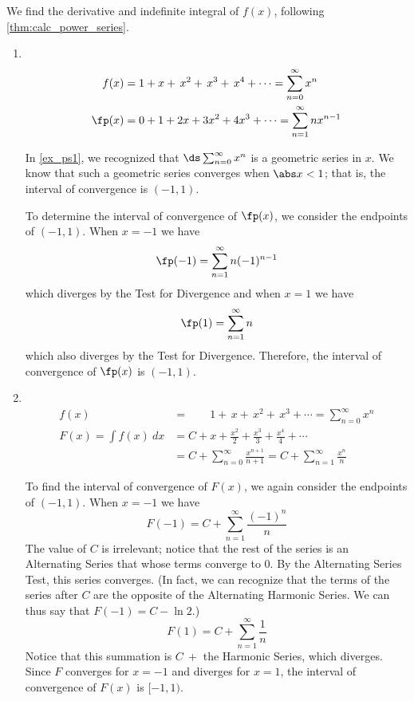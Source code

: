 {We find the derivative and indefinite integral of $f(x)$, following \autoref{thm:calc_power_series}.

\begin{enumerate}
\item\mbox{}\\[-3\baselineskip]
\begin{align*}
f(x)&=1+x+\,x^2+\,x^3+\,x^4+\dotsb = \sum_{n=0}^\infty x^n\\
\fp(x) &= 0+1+2x+3x^2+4x^3+\dotsb=\sum_{n=1}^\infty nx^{n-1} 
\end{align*}

In \autoref{ex_ps1}, we recognized that $\ds \sum_{n=0}^\infty x^n$ is a geometric series in $x$. We know that such a geometric series converges when $\abs x<1$; that is, the interval of convergence is $(-1,1)$.

To determine the interval of convergence of $\fp(x)$, we consider the endpoints of $(-1,1)$.
When $x=-1$ we have
\[\fp(-1) = \sum_{n=1}^\infty n(-1)^{n-1}\]
which diverges by the Test for Divergence
and when $x=1$ we have
\[\fp(1) = \sum_{n=1}^\infty n\]
which also diverges by the Test for Divergence. Therefore, the interval of convergence of $\fp(x)$ is $(-1,1)$. 

\item\mbox{}\\[-3\baselineskip]
\begin{align*}
 f(x)&=\phantom{C+{}}1+\,x+\,x^2+\,x^3+\dotsb = \sum_{n=0}^\infty x^n\\
 F(x) = \int f(x)\ dx &= C+ x+\frac{x^2}{2}+\frac{x^3}3+\frac{x^4}4+\dotsb \\
 &= C+\sum_{n=0}^\infty \frac{x^{n+1}}{n+1}=C+\sum_{n=1}^\infty \frac{x^{n}}{n}  
\end{align*}

To find the interval of convergence of $F(x)$, we again consider the endpoints of $(-1,1)$.
When $x=-1$ we have
\[F(-1) = C+\sum_{n=1}^\infty \frac{(-1)^{n}}{n}\]
The value of $C$ is irrelevant; notice that the rest of the series is an Alternating Series that whose terms converge to 0. By the Alternating Series Test, this series converges. (In fact, we can recognize that the terms of the series after $C$ are the opposite of the Alternating Harmonic Series. We can thus say that $F(-1) = C-\ln 2$.)
\[F(1) = C+\sum_{n=1}^\infty \frac{1}{n} \]
Notice that this summation is $C\ +$ the Harmonic Series, which diverges. Since $F$ converges for $x=-1$ and diverges for $x=1$, the interval of convergence of $F(x)$ is $[-1,1)$.\eoehere
\end{enumerate}}

